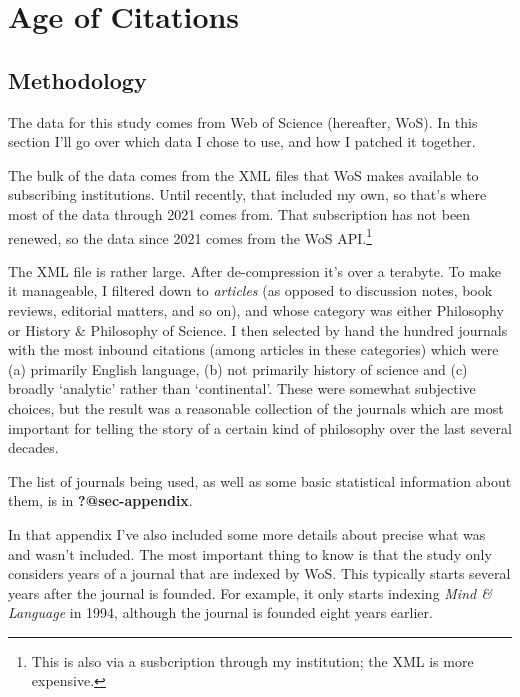 \documentclass[
  12pt,
  letterpaper,
  DIV=11,
  numbers=noendperiod]{scrartcl}
\begin{document}
\section{Age of Citations}\label{sec-age}

\subsection{Methodology}\label{sec-methodology}

The data for this study comes from Web of Science (hereafter, WoS). In
this section I'll go over which data I chose to use, and how I patched
it together.

The bulk of the data comes from the XML files that WoS makes available
to subscribing institutions. Until recently, that included my own, so
that's where most of the data through 2021 comes from. That subscription
has not been renewed, so the data since 2021 comes from the WoS
API.\footnote{This is also via a susbcription through my institution;
  the XML is more expensive.}

The XML file is rather large. After de-compression it's over a terabyte.
To make it manageable, I filtered down to \emph{articles} (as opposed to
discussion notes, book reviews, editorial matters, and so on), and whose
category was either Philosophy or History \& Philosophy of Science. I
then selected by hand the hundred journals with the most inbound
citations (among articles in these categories) which were (a) primarily
English language, (b) not primarily history of science and (c) broadly
`analytic' rather than `continental'. These were somewhat subjective
choices, but the result was a reasonable collection of the journals
which are most important for telling the story of a certain kind of
philosophy over the last several decades.

The list of journals being used, as well as some basic statistical
information about them, is in \textbf{?@sec-appendix}.

In that appendix I've also included some more details about precise what
was and wasn't included. The most important thing to know is that the
study only considers years of a journal that are indexed by WoS. This
typically starts several years after the journal is founded. For
example, it only starts indexing \emph{Mind \& Language} in 1994,
although the journal is founded eight years earlier.
\end{document}
